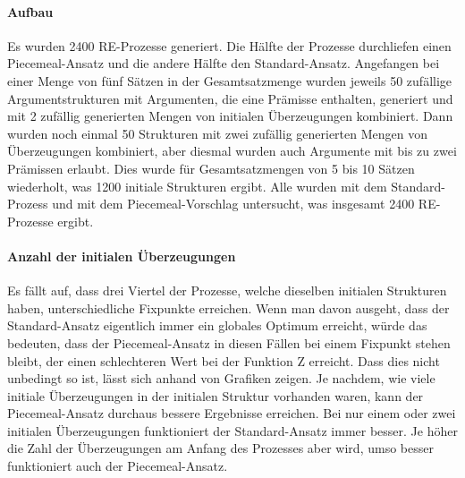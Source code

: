 \documentclass{article}
\begin{document}
\paragraph{Aufbau} Es wurden 2400 RE-Prozesse generiert. Die Hälfte der Prozesse durchliefen einen Piecemeal-Ansatz und die andere Hälfte den Standard-Ansatz. Angefangen bei einer Menge von fünf Sätzen in der Gesamtsatzmenge wurden jeweils 50 zufällige Argumentstrukturen mit Argumenten, die eine Prämisse enthalten, generiert und mit 2 zufällig generierten Mengen von initialen Überzeugungen kombiniert. Dann wurden noch einmal 50 Strukturen mit zwei zufällig generierten Mengen von Überzeugungen kombiniert, aber diesmal wurden auch Argumente mit bis zu zwei Prämissen erlaubt. Dies wurde für Gesamtsatzmengen von 5 bis 10 Sätzen wiederholt, was 1200 initiale Strukturen ergibt. Alle wurden mit dem Standard-Prozess und mit dem Piecemeal-Vorschlag untersucht, was insgesamt 2400 RE-Prozesse ergibt.

\paragraph{Anzahl der initialen Überzeugungen} Es fällt auf, dass drei Viertel der Prozesse, welche dieselben initialen Strukturen haben, unterschiedliche Fixpunkte erreichen. Wenn man davon ausgeht, dass der Standard-Ansatz eigentlich immer ein globales Optimum erreicht, würde das bedeuten, dass der Piecemeal-Ansatz in diesen Fällen bei einem Fixpunkt stehen bleibt, der einen schlechteren Wert bei der Funktion Z erreicht. Dass dies nicht unbedingt so ist, lässt sich anhand von Grafiken zeigen. Je nachdem, wie viele initiale Überzeugungen in der initialen Struktur vorhanden waren, kann der Piecemeal-Ansatz durchaus bessere Ergebnisse erreichen. Bei nur einem oder zwei initialen Überzeugungen funktioniert der Standard-Ansatz immer besser. Je höher die Zahl der Überzeugungen am Anfang des Prozesses aber wird, umso besser funktioniert auch der Piecemeal-Ansatz.
\end{document}
